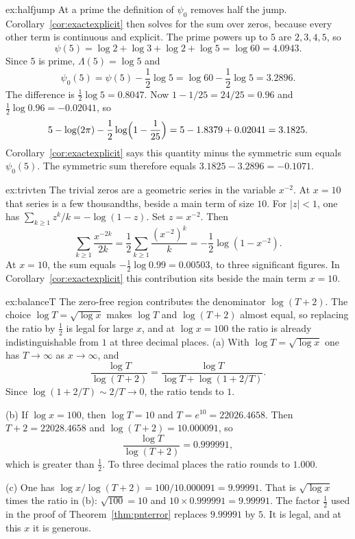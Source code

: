 \begin{solution}{ex:halfjump}
\idea At a prime the definition of $\psi_0$ removes half the jump. Corollary~\ref{cor:exactexplicit} then solves for the sum over zeros, because every other term is continuous and explicit.
\writeup The prime powers up to $5$ are $2,3,4,5$, so
\[
\psi(5)=\log2+\log3+\log2+\log5=\log60=4.0943.
\]
Since $5$ is prime, $\Lambda(5)=\log5$ and
\[
\psi_0(5)=\psi(5)-\frac12\log5=\log60-\frac12\log5=3.2896.
\]
The difference is $\frac12\log5=0.8047$. Now $1-1/25=24/25=0.96$ and $\frac12\log0.96=-0.02041$, so
\[
5-\log(2\pi)-\frac12\log\Bigl(1-\frac1{25}\Bigr)=5-1.8379+0.02041=3.1825.
\]
Corollary~\ref{cor:exactexplicit} says this quantity minus the symmetric sum equals $\psi_0(5)$. The symmetric sum therefore equals $3.1825-3.2896=-0.1071$.
\end{solution}

\begin{solution}{ex:trivten}
\idea The trivial zeros are a geometric series in the variable $x^{-2}$. At $x=10$ that series is a few thousandths, beside a main term of size $10$.
\writeup For $|z|<1$, one has $\sum_{k\ge1}z^k/k=-\log(1-z)$. Set $z=x^{-2}$. Then
\[
\sum_{k\ge1}\frac{x^{-2k}}{2k}=\frac12\sum_{k\ge1}\frac{(x^{-2})^k}k=-\frac12\log(1-x^{-2}).
\]
At $x=10$, the sum equals $-\frac12\log0.99=0.00503$, to three significant figures. In Corollary~\ref{cor:exactexplicit} this contribution sits beside the main term $x=10$.
\end{solution}

\begin{solution}{ex:balanceT}
\idea The zero-free region contributes the denominator $\log(T+2)$. The choice $\log T=\sqrt{\log x}$ makes $\log T$ and $\log(T+2)$ almost equal, so replacing the ratio by $\frac12$ is legal for large $x$, and at $\log x=100$ the ratio is already indistinguishable from $1$ at three decimal places.
\writeup (a) With $\log T=\sqrt{\log x}$ one has $T\to\infty$ as $x\to\infty$, and
\[
\frac{\log T}{\log(T+2)}=\frac{\log T}{\log T+\log(1+2/T)}.
\]
Since $\log(1+2/T)\sim2/T\to0$, the ratio tends to $1$.

(b) If $\log x=100$, then $\log T=10$ and $T=e^{10}=22026.4658$. Then $T+2=22028.4658$ and $\log(T+2)=10.000091$, so
\[
\frac{\log T}{\log(T+2)}=0.999991,
\]
which is greater than $\frac12$. To three decimal places the ratio rounds to $1.000$.

(c) One has $\log x/\log(T+2)=100/10.000091=9.99991$. That is $\sqrt{\log x}$ times the ratio in (b): $\sqrt{100}=10$ and $10\times0.999991=9.99991$. The factor $\frac12$ used in the proof of Theorem~\ref{thm:pnterror} replaces $9.99991$ by $5$. It is legal, and at this $x$ it is generous.
\end{solution}

